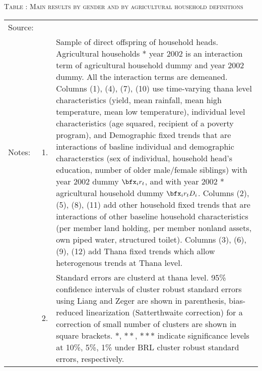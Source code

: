 \begin{table}
\hfil\textsc{\footnotesize Table \thetable: Main results by gender and by agricultural household definitions\label{MainGenderByAgdefResults}}\\
\setlength{\tabcolsep}{1pt}
\renewcommand{\arraystretch}{.55}
\hspace{-1.25cm}

\renewcommand{\arraystretch}{1}
\hfil\begin{tabular}{>{\hfill\scriptsize}p{1cm}<{}>{\hfill\scriptsize}p{.5cm}<{}>{\scriptsize}p{12cm}<{\hfill}}
Source:& \multicolumn{2}{l}{\scriptsize Compiled from IFPRI data. }\\[-1ex]
Notes:& 1. & Sample of direct offspring of household heads. \textsf{Agricultural households * year 2002} is an interaction term of agricultural household dummy and year 2002 dummy. All the interaction terms are demeaned. Columns \textsf{(1), (4), (7), (10)} use time-varying thana level characteristics (yield, mean rainfall, mean high temperature, mean low temperature), individual level characteristics (age squared, recipient of a poverty program), and \textsf{Demographic fixed trends} that are interactions of basline individual and demographic characterstics (sex of individual, household head's education, number of older male/female siblings) with year 2002 dummy $\bfx_{i}r_{t}$, and with year 2002 * agricultural household dummy $\bfx_{i}r_{t}D_{i}$. Columns \textsf{(2), (5), (8), (11)} add \textsf{other household fixed trends} that are interactions of other baseline household characteristics (per member land holding, per member nonland assets, own piped water, structured toilet). Columns \textsf{(3), (6), (9), (12)} add \textsf{Thana fixed trends} which allow heterogenous trends at Thana level. \\[-1ex]
& 2. & Standard errors are clusterd at thana level. 95\% confidence intervals of cluster robust standard errors using Liang and Zeger are shown in parenthesis, bias-reduced linearization (Satterthwaite correction) for a correction of small number of clusters are shown in square brackets. $*$, $**$, $***$ indicate significance levels at 10\%, 5\%, 1\% under BRL cluster robust standard errors, respectively.\end{tabular}
\end{table}



